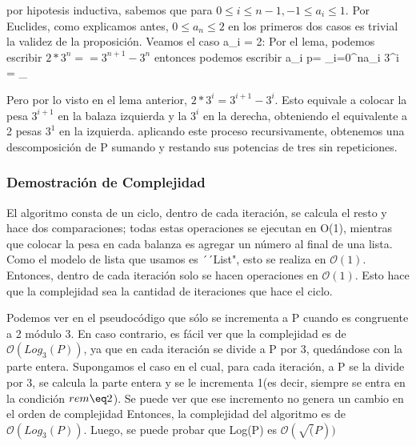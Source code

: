 \documentclass[spanish,12pt]{article}
\begin{document}
por hipotesis inductiva, sabemos que para $0\leq i \leq n-1, -1\leq a_{i}\leq 1$. Por Euclides, como explicamos antes, $0\leq a_{n} \leq 2 $ en los primeros dos casos es trivial la validez de la proposición. 
Veamos el caso a_{i} = 2:
  Por el lema, podemos escribir $2*3^{n}= = 3^{n+1}-3^{n}$  entonces  podemos escribir a_{i} p= \sum_{i=0}^{n}{a_i 3^{i}} = \sum_{ 


 Pero por lo visto en el lema anterior, $2*3^{i}= 3^{i+1}-3^{i}$. Esto equivale a colocar la pesa $3^{i+1}$ en la balaza izquierda y la $3^{i}$ en la derecha, obteniendo el equivalente a 2 pesas $3^{1}$ en la izquierda. aplicando este proceso recursivamente, obtenemos  una descomposición de P sumando y restando sus potencias de tres sin repeticiones.


\subsubsection{Demostración de Complejidad}

El algoritmo consta de un ciclo, dentro de cada iteración, se calcula el resto y hace dos comparaciones; todas estas operaciones se ejecutan en O(1), mientras que colocar la pesa en cada balanza
es agregar un número al final de una lista. Como el modelo de lista que usamos es ´´List", esto se realiza en $\mathcal{O}(1)$.
Entonces, dentro de cada iteración solo se hacen operaciones en $\mathcal{O}(1)$. Esto hace que la complejidad sea la cantidad de iteraciones que hace el ciclo.


Podemos ver en el pseudocódigo que sólo se incrementa a P cuando es congruente a 2 módulo 3. En caso contrario, es fácil ver que la complejidad es de $\mathcal{O}(Log_{3}(P))$, ya que en cada iteración se divide a P por 3, quedándose con la parte entera.
Supongamos el caso en el cual, para cada iteración, a P se la divide por 3, se calcula la parte entera y se le incrementa 1(es decir, siempre se entra en la condición $rem \eq 2$). Se puede ver que ese incremento no genera un cambio en el orden de complejidad
Entonces, la complejidad del algoritmo es de $\mathcal{O}(Log_{3}(P))$.
Luego, se puede probar que Log(P) es $\mathcal{O}(\sqrt(P))$





}
\end{document}
